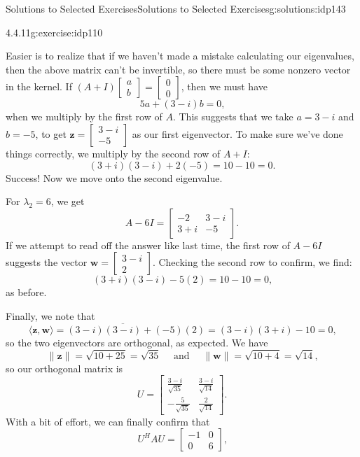 \documentclass[oneside,10pt,]{book}
\numberwithin{equation}{section}
\newcommand{\bbm}{\begin{bmatrix}}
\newcommand{\ebm}{\end{bmatrix}}
\newcommand{\len}[1]{\lVert #1\rVert}
\newcommand{\zz}{\mathbf{z}}
\newcommand{\ww}{\mathbf{w}}
\newcommand{\amp}{&}
\begin{document}
\begin{solutions-chapter}{Solutions to Selected Exercises}{}{Solutions to Selected Exercises}{}{}{g:solutions:idp143}
\begin{inlinesolution}{4.4.11}{}{g:exercise:idp110}
\par
Easier is to realize that if we haven't made a mistake calculating our eigenvalues, then the above matrix can't be invertible, so there must be some nonzero vector in the kernel. If \((A+I)\bbm a\\b\ebm=\bbm0\\0\ebm\), then we must have%
\begin{equation*}
5a+(3-i)b=0\text{,}
\end{equation*}
when we multiply by the first row of \(A\). This suggests that we take \(a=3-i\) and \(b=-5\), to get \(\zz = \bbm 3-i\\-5\ebm\) as our first eigenvector. To make sure we've done things correctly, we multiply by the second row of \(A+I\):%
\begin{equation*}
(3+i)(3-i)+2(-5) = 10-10 = 0\text{.}
\end{equation*}
Success! Now we move onto the second eigenvalue.%
\par
For \(\lambda_2=6\), we get%
\begin{equation*}
A-6I = \bbm -2\amp 3-i\\3+i\amp -5\ebm\text{.}
\end{equation*}
If we attempt to read off the answer like last time, the first row of \(A-6I\) suggests the vector \(\ww = \bbm 3-i\\2\ebm\). Checking the second row to confirm, we find:%
\begin{equation*}
(3+i)(3-i)-5(2) = 10-10=0\text{,}
\end{equation*}
as before.%
\par
Finally, we note that%
\begin{equation*}
\langle \zz, \ww\rangle = (3-i)\overline{(3-i)}+(-5)(2) = (3-i)(3+i)-10 = 0\text{,}
\end{equation*}
so the two eigenvectors are orthogonal, as expected. We have%
\begin{equation*}
\len{\zz}=\sqrt{10+25}=\sqrt{35} \quad \text{ and } \quad \len{\ww}=\sqrt{10+4}=\sqrt{14}\text{,}
\end{equation*}
so our orthogonal matrix is%
\begin{equation*}
U = \bbm \frac{3-i}{\sqrt{35}}\amp \frac{3-i}{\sqrt{14}}\\-\frac{5}{\sqrt{35}}\amp \frac{2}{\sqrt{14}}\ebm\text{.}
\end{equation*}
With a bit of effort, we can finally confirm that%
\begin{equation*}
U^HAU = \bbm -1\amp 0\\0\amp 6\ebm\text{,}

\end{equation*}
\end{inlinesolution}
\end{solutions-chapter}
\end{document}
